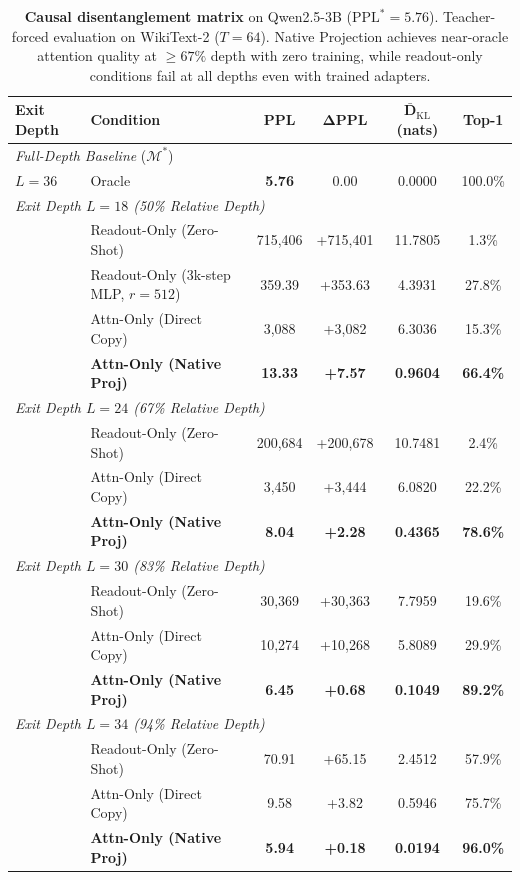 \documentclass{article}
\newcommand{\kl}{\bar{D}_{\mathrm{KL}}}
\begin{document}
\begin{table}[t]
\centering
\caption{\textbf{Causal disentanglement matrix} on Qwen2.5-3B ($\text{PPL}^* = 5.76$). Teacher-forced evaluation on WikiText-2 ($T=64$). Native Projection achieves near-oracle attention quality at $\ge 67\%$ depth with zero training, while readout-only conditions fail at all depths even with trained adapters.}
\label{tab:main}
\small
\begin{tabular}{@{}llcccc@{}}
\toprule
\textbf{Exit Depth} & \textbf{Condition} & \textbf{PPL} & $\boldsymbol{\Delta}$\textbf{PPL} & $\boldsymbol{\kl}$ \textbf{(nats)} & \textbf{Top-1} \\
\midrule
\multicolumn{6}{l}{\textit{Full-Depth Baseline} ($\mathcal{M}^*$)} \\
$L = 36$ & Oracle & \textbf{5.76} & 0.00 & 0.0000 & 100.0\% \\
\midrule
\midrule
\multicolumn{6}{l}{\textit{Exit Depth $L = 18$ (50\% Relative Depth)}} \\
 & Readout-Only (Zero-Shot) & 715,406 & +715,401 & 11.7805 & 1.3\% \\
 & Readout-Only (3k-step MLP, $r{=}512$) & 359.39 & +353.63 & 4.3931 & 27.8\% \\
 & Attn-Only (Direct Copy) & 3,088 & +3,082 & 6.3036 & 15.3\% \\
 & \textbf{Attn-Only (Native Proj)} & \textbf{13.33} & \textbf{+7.57} & \textbf{0.9604} & \textbf{66.4\%} \\
\midrule
\multicolumn{6}{l}{\textit{Exit Depth $L = 24$ (67\% Relative Depth)}} \\
 & Readout-Only (Zero-Shot) & 200,684 & +200,678 & 10.7481 & 2.4\% \\
 & Attn-Only (Direct Copy) & 3,450 & +3,444 & 6.0820 & 22.2\% \\
 & \textbf{Attn-Only (Native Proj)} & \textbf{8.04} & \textbf{+2.28} & \textbf{0.4365} & \textbf{78.6\%} \\
\midrule
\multicolumn{6}{l}{\textit{Exit Depth $L = 30$ (83\% Relative Depth)}} \\
 & Readout-Only (Zero-Shot) & 30,369 & +30,363 & 7.7959 & 19.6\% \\
 & Attn-Only (Direct Copy) & 10,274 & +10,268 & 5.8089 & 29.9\% \\
 & \textbf{Attn-Only (Native Proj)} & \textbf{6.45} & \textbf{+0.68} & \textbf{0.1049} & \textbf{89.2\%} \\
\midrule
\multicolumn{6}{l}{\textit{Exit Depth $L = 34$ (94\% Relative Depth)}} \\
 & Readout-Only (Zero-Shot) & 70.91 & +65.15 & 2.4512 & 57.9\% \\
 & Attn-Only (Direct Copy) & 9.58 & +3.82 & 0.5946 & 75.7\% \\
 & \textbf{Attn-Only (Native Proj)} & \textbf{5.94} & \textbf{+0.18} & \textbf{0.0194} & \textbf{96.0\%} \\
\bottomrule
\end{tabular}
\end{table}
\end{document}
